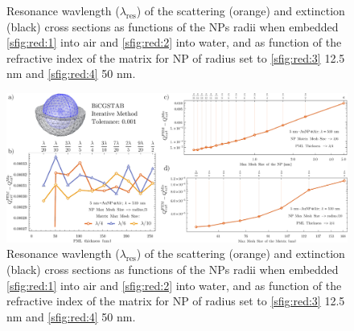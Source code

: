%
\begin{figure}[h!]\centering
	\def\svgwidth{.8\textwidth} \small
{}
\vspace*{-1em}
\caption[Spectral redshift of the scattering and extinciton of a spherical AuNP as function of its size and the embedding media]{Resonance wavlength ($\lambda_\text{res}$) of the scattering (orange) and extinction (black) cross sections as functions of the NPs radii when embedded  \ref{sfig:red:1} into air and \ref{sfig:red:2} into water, and as function of the refractive index of the matrix for NP of radius set to  \ref{sfig:red:3} 12.5 nm and \ref{sfig:red:4} 50 nm.}
\end{figure}

















%
\begin{figure}\centering
\includegraphics[scale = .8 ]{1-Theory-Figs/drawingCOMSOL.pdf}
\caption[Convergence tests: The Meshing]{Resonance wavlength ($\lambda_\text{res}$) of the scattering (orange) and extinction (black) cross sections as functions of the NPs radii when embedded  \ref{sfig:red:1} into air and \ref{sfig:red:2} into water, and as function of the refractive index of the matrix for NP of radius set to  \ref{sfig:red:3} 12.5 nm and \ref{sfig:red:4} 50 nm.}
\end{figure}

\clearpage

